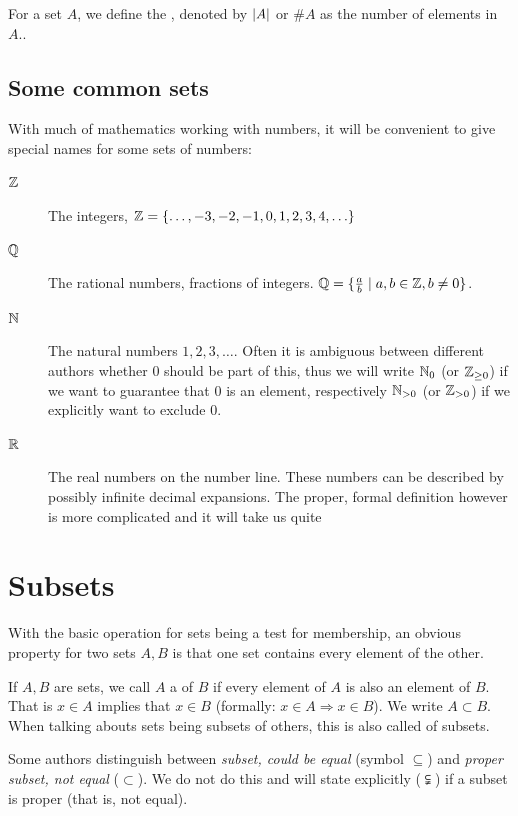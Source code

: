 For a set $A$, we define the , denoted by $\left|A\right|$ or
$\# A$ as the number of elements in $A$..

\subsection{Some common sets}

With much of mathematics working with numbers, it will be convenient to give
special names for some sets of numbers:
\begin{description}
\item[${\mathbb Z}$] The integers, ${\mathbb Z}=\{\ldots,-3,-2,-1,0,1,2,3,4,\ldots\}$
\item[${\mathbb Q}$] The rational numbers, fractions of integers.
${\mathbb Q}=\{\frac{a}{b}\mid a,b\in{\mathbb Z}, b\not=0\}$.
\item[${\mathbb N}$] The natural numbers $1,2,3,\ldots$. Often it is ambiguous
between different authors whether $0$ should be part of this, thus we will
write ${\mathbb N}_0$ (or ${\mathbb Z}_{\ge 0}$) if we want to guarantee that $0$ is an
element, respectively ${\mathbb N}_{>0}$ (or ${\mathbb Z}_{>0}$) if we explicitly want to
exclude $0$.
\item[${\mathbb R}$] The real numbers on the number line. These numbers can be
described by possibly infinite decimal expansions. The proper, formal
definition however is more complicated and it will take us quite 
\end{description}


\section{Subsets}
\label{secsubsets}

With the basic operation for sets being a test for membership, an obvious
property for two sets $A,B$ is that one set contains every element of the
other.

\begin{defn}
If $A,B$ are sets, we call $A$ a  of $B$ if every element of
$A$ is also an element of $B$. That is $x\in A$ implies that $x\in B$
(formally: $x\in A\Rightarrow x\in B$). We write $A\subset B$.
When talking abouts sets being subsets of others, this is also called
 of subsets.
\end{defn}
\begin{note}
Some authors distinguish between {\em subset, could be equal} (symbol
$\subseteq$) and {\em proper subset, not equal} ($\subset$). We do not do
this and will state explicitly ($\subsetneqq$) if a subset is 
proper (that is, not equal).
\end{note}

